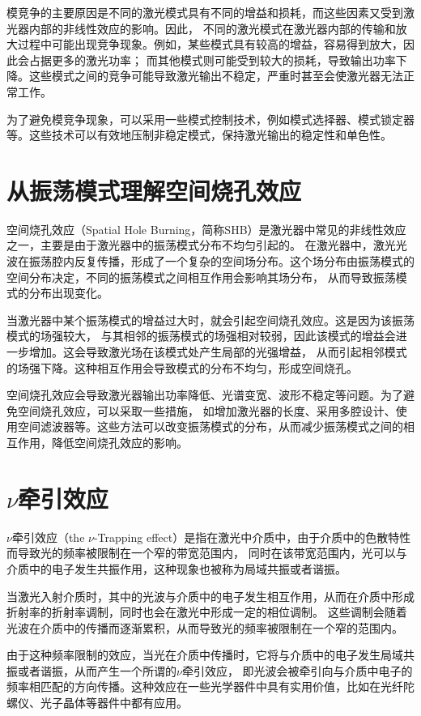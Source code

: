 \documentclass[12pt, a4paper, oneside]{article}
\begin{document}
\begin{spacing}{2.0}
模竞争的主要原因是不同的激光模式具有不同的增益和损耗，而这些因素又受到激光器内部的非线性效应的影响。因此，
不同的激光模式在激光器内部的传输和放大过程中可能出现竞争现象。例如，某些模式具有较高的增益，容易得到放大，因此会占据更多的激光功率；
而其他模式则可能受到较大的损耗，导致输出功率下降。这些模式之间的竞争可能导致激光输出不稳定，严重时甚至会使激光器无法正常工作。

为了避免模竞争现象，可以采用一些模式控制技术，例如模式选择器、模式锁定器等。这些技术可以有效地压制非稳定模式，保持激光输出的稳定性和单色性。

\section{从振荡模式理解空间烧孔效应}
空间烧孔效应（Spatial Hole Burning，简称SHB）是激光器中常见的非线性效应之一，主要是由于激光器中的振荡模式分布不均匀引起的。
在激光器中，激光光波在振荡腔内反复传播，形成了一个复杂的空间场分布。这个场分布由振荡模式的空间分布决定，不同的振荡模式之间相互作用会影响其场分布，
从而导致振荡模式的分布出现变化。

当激光器中某个振荡模式的增益过大时，就会引起空间烧孔效应。这是因为该振荡模式的场强较大，
与其相邻的振荡模式的场强相对较弱，因此该模式的增益会进一步增加。这会导致激光场在该模式处产生局部的光强增益，
从而引起相邻模式的场强下降。这种相互作用会导致模式的分布不均匀，形成空间烧孔。

空间烧孔效应会导致激光器输出功率降低、光谱变宽、波形不稳定等问题。为了避免空间烧孔效应，可以采取一些措施，
如增加激光器的长度、采用多腔设计、使用空间滤波器等。这些方法可以改变振荡模式的分布，从而减少振荡模式之间的相互作用，降低空间烧孔效应的影响。



\section{$\nu$牵引效应}
$\nu$牵引效应（the $\nu$-Trapping effect）是指在激光中介质中，由于介质中的色散特性而导致光的频率被限制在一个窄的带宽范围内，
同时在该带宽范围内，光可以与介质中的电子发生共振作用，这种现象也被称为局域共振或者谐振。

当激光入射介质时，其中的光波与介质中的电子发生相互作用，从而在介质中形成折射率的折射率调制，同时也会在激光中形成一定的相位调制。
这些调制会随着光波在介质中的传播而逐渐累积，从而导致光的频率被限制在一个窄的范围内。

由于这种频率限制的效应，当光在介质中传播时，它将与介质中的电子发生局域共振或者谐振，从而产生一个所谓的$\nu$牵引效应，
即光波会被牵引向与介质中电子的频率相匹配的方向传播。这种效应在一些光学器件中具有实用价值，比如在光纤陀螺仪、光子晶体等器件中都有应用。




\end{spacing}
\end{document}
